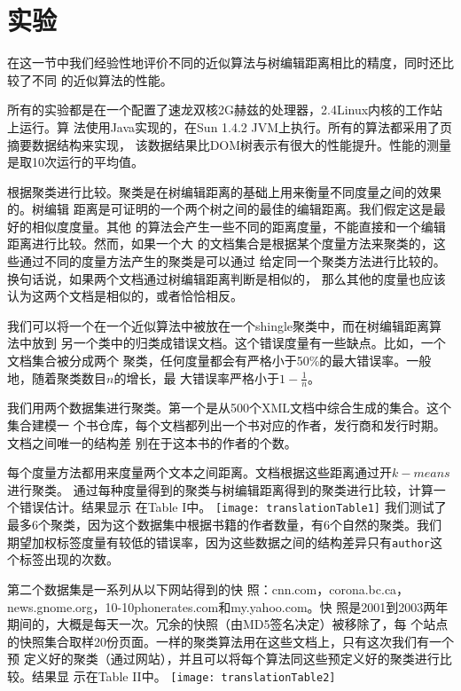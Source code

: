 \section{实验}
在这一节中我们经验性地评价不同的近似算法与树编辑距离相比的精度，同时还比较了不同
的近似算法的性能。

所有的实验都是在一个配置了速龙双核2G赫兹的处理器，2.4Linux内核的工作站上运行。算
法使用Java实现的，在Sun 1.4.2 JVM上执行。所有的算法都采用了页摘要数据结构来实现，
该数据结果比DOM树表示有很大的性能提升。性能的测量是取10次运行的平均值。

根据聚类进行比较。聚类是在树编辑距离的基础上用来衡量不同度量之间的效果的。树编辑
距离是可证明的一个两个树之间的最佳的编辑距离。我们假定这是最好的相似度度量。其他
的算法会产生一些不同的距离度量，不能直接和一个编辑距离进行比较。然而，如果一个大
的文档集合是根据某个度量方法来聚类的，这些通过不同的度量方法产生的聚类是可以通过
给定同一个聚类方法进行比较的。换句话说，如果两个文档通过树编辑距离判断是相似的，
那么其他的度量也应该认为这两个文档是相似的，或者恰恰相反。

我们可以将一个在一个近似算法中被放在一个shingle聚类中，而在树编辑距离算法中放到
另一个类中的归类成错误文档。这个错误度量有一些缺点。比如，一个文档集合被分成两个
聚类，任何度量都会有严格小于50\%的最大错误率。一般地，随着聚类数目$n$的增长，最
大错误率严格小于$1-\frac{1}{n}$。

我们用两个数据集进行聚类。第一个是从500个XML文档中综合生成的集合。这个集合建模一
个书仓库，每个文档都列出一个书对应的作者，发行商和发行时期。文档之间唯一的结构差
别在于这本书的作者的个数。

每个度量方法都用来度量两个文本之间距离。文档根据这些距离通过开$k-means$进行聚类。
通过每种度量得到的聚类与树编辑距离得到的聚类进行比较，计算一个错误估计。结果显示
在Table I中。
{\centering
  \texttt{[image: translationTable1]}
}
我们测试了最多6个聚类，因为这个数据集中根据书籍的作者数量，有6个自然的聚类。我们
期望加权标签度量有较低的错误率，因为这些数据之间的结构差异只有\texttt{author}这
个标签出现的次数。

第二个数据集是一系列从以下网站得到的快
照：cnn.com，corona.bc.ca，news.gnome.org，10-10phonerates.com和my.yahoo.com。快
照是2001到2003两年期间的，大概是每天一次。冗余的快照（由MD5签名决定）被移除了，每
个站点的快照集合取样20份页面。一样的聚类算法用在这些文档上，只有这次我们有一个预
定义好的聚类（通过网站），并且可以将每个算法同这些预定义好的聚类进行比较。结果显
示在Table II中。{\centering
\texttt{[image: translationTable2]}
}

